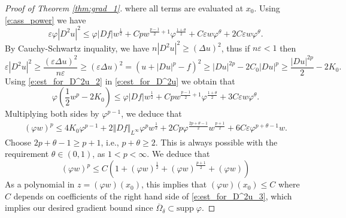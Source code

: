 \documentclass[11pt,reqno]{amsart}
\numberwithin{figure}{section}
\theoremstyle{plain}
\theoremstyle{remark}
\numberwithin{equation}{section}
\begin{document}
\begin{appendices}
\begin{proof}[Proof of Theorem \ref{thm:grad_1}]
 where all terms are evaluated at $x_0$. Using \eqref{e:ass_power} we have
\begin{equation}\label{e:est_for_D^2u}
    \varepsilon \varphi|D^2u|^2 \leq  \varphi |Df|w^{\frac{1}{2}}+ Cp w^{\frac{p-1}{2}+1} \varphi^{\frac{1+\theta}{2}} + C\varepsilon w \varphi^{\theta} + 2C\varepsilon  w\varphi^\theta.
\end{equation}
By Cauchy-Schwartz inquality, we have $n|D^2u|^2\geq (\Delta u)^2$, thus if $n\varepsilon < 1$ then
\begin{equation}\label{e:est_for_D^2u_2}
    \varepsilon |D^2u|^2 \geq \frac{(\varepsilon \Delta u)^2}{n\varepsilon} \geq (\varepsilon \Delta u)^2 = \left(  u + |Du|^p - f\right)^2 \geq |Du|^{2p} - 2C_0|Du|^p \geq \frac{|Du|^{2p}}{2} - 2K_0.
\end{equation}
Using \eqref{e:est_for_D^2u_2} in \eqref{e:est_for_D^2u} we obtain that
\begin{equation*}
    \varphi\left(\frac{1}{2}w^p - 2K_0\right) \leq \varphi |Df|w^{\frac{1}{2}}+ Cp w^{\frac{p-1}{2}+1} \varphi^{\frac{1+\theta}{2}} + 3C\varepsilon w \varphi^{\theta}.
\end{equation*}
Multiplying both sides by $\varphi^{p-1}$, we deduce that
\begin{align*}
    (\varphi w)^p \leq 4K_0\varphi^{p-1} + 2\Vert Df\Vert_{L^\infty}\varphi^p w^{\frac{1}{2}} + 2Cp \varphi^{\frac{2p+\theta - 1}{2}}w^{\frac{p+1}{2}} + 6C\varepsilon \varphi^{p+\theta - 1}w.
\end{align*}
Choose $2p+\theta -1 \geq p+1$, i.e., $p+\theta\geq 2$. This is always possible with the requirement $\theta \in (0,1)$, as $1<p <\infty$. We deduce that 
\begin{equation}\label{e:est_for_D^2u_3}
    (\varphi w)^p \leq C\left(1+ (\varphi w)^\frac{1}{2} + (\varphi w)^\frac{p+1}{2} +(\varphi w)\right)
\end{equation}
As a polynomial in $z = (\varphi w)(x_0)$, this implies that $(\varphi w)(x_0)\leq C$ where $C$ depends on coefficients of the right hand side of \eqref{e:est_for_D^2u_3}, which implies our desired gradient bound since $\overline{\Omega}_\delta\subset \mathrm{supp}\;\varphi$.
\end{proof}




\end{appendices}
\end{document}
